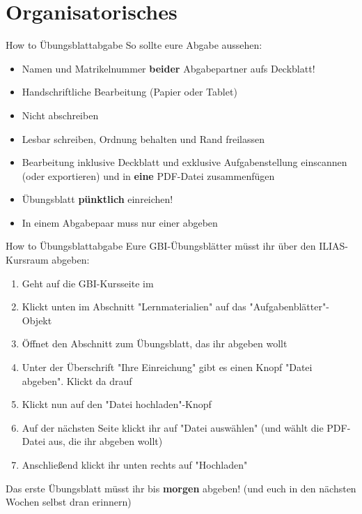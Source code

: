 
\newcommand{\handout}{}



\morescalingdelimiters



\section{Organisatorisches}

\begin{frame}[t]{How to Übungsblattabgabe}
	So sollte eure Abgabe aussehen:
	\begin{itemize}
		\item Namen und Matrikelnummer \textbf{beider} Abgabepartner aufs Deckblatt!
		\item Handschriftliche Bearbeitung (Papier oder Tablet)
		\item Nicht abschreiben
		\item Lesbar schreiben, Ordnung behalten und Rand freilassen
		\item Bearbeitung inklusive Deckblatt und exklusive Aufgabenstellung einscannen (oder exportieren) und in \textbf{eine} PDF-Datei zusammenfügen
		\item Übungsblatt \textbf{pünktlich} einreichen!
		\item In einem Abgabepaar muss nur einer abgeben
	\end{itemize}
\end{frame}

\begin{frame}[t]{How to Übungsblattabgabe}
	Eure GBI-Übungsblätter müsst ihr über den ILIAS-Kursraum abgeben:
	\begin{enumerate}
		\item Geht auf die GBI-Kursseite im \ILIAS
		\item Klickt unten im Abschnitt "Lernmaterialien" auf das "Aufgabenblätter"-Objekt
		\item Öffnet den Abschnitt zum Übungsblatt, das ihr abgeben wollt
		\item Unter der Überschrift "Ihre Einreichung" gibt es einen Knopf "Datei abgeben". Klickt da drauf
		\item Klickt nun auf den "Datei hochladen"-Knopf
		\item Auf der nächsten Seite klickt ihr auf "Datei auswählen" (und wählt die PDF-Datei aus, die ihr abgeben wollt)
		\item Anschließend klickt ihr unten rechts auf "Hochladen"
	\end{enumerate}
	\pause
	Das erste Übungsblatt müsst ihr bis \textbf{morgen} abgeben! (und euch in den nächsten Wochen selbst dran erinnern)
\end{frame}

